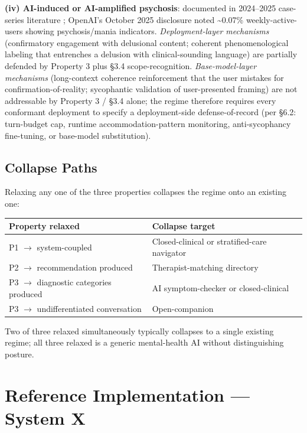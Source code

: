 \documentclass[letterpaper]{article}
\begin{document}
\textbf{(iv) AI-induced or AI-amplified psychosis}: documented in 2024--2025 case-series literature \citep{sakata2025psychosis}; OpenAI's October 2025 disclosure noted \textasciitilde0.07\% weekly-active-users showing psychosis/mania indicators. \emph{Deployment-layer mechanisms} (confirmatory engagement with delusional content; coherent phenomenological labeling that entrenches a delusion with clinical-sounding language) are partially defended by Property 3 plus \S3.4 scope-recognition. \emph{Base-model-layer mechanisms} (long-context coherence reinforcement that the user mistakes for confirmation-of-reality; sycophantic validation of user-presented framing) are not addressable by Property 3 / \S3.4 alone; the regime therefore requires every conformant deployment to specify a deployment-side defense-of-record (per \S6.2: turn-budget cap, runtime accommodation-pattern monitoring, anti-sycophancy fine-tuning, or base-model substitution).

\subsection{Collapse Paths}

Relaxing any one of the three properties collapses the regime onto an existing one:

\begin{table}[ht]
\centering
\footnotesize
\begin{tabular}{p{}p{}}
\toprule
Property relaxed & Collapse target \\
\midrule
P1 $\rightarrow$ system-coupled & Closed-clinical or stratified-care navigator \\
P2 $\rightarrow$ recommendation produced & Therapist-matching directory \\
P3 $\rightarrow$ diagnostic categories produced & AI symptom-checker or closed-clinical \\
P3 $\rightarrow$ undifferentiated conversation & Open-companion \\
\bottomrule
\end{tabular}
\end{table}

Two of three relaxed simultaneously typically collapses to a single existing regime; all three relaxed is a generic mental-health AI without distinguishing posture.

\section{Reference Implementation --- System X}
\end{document}
